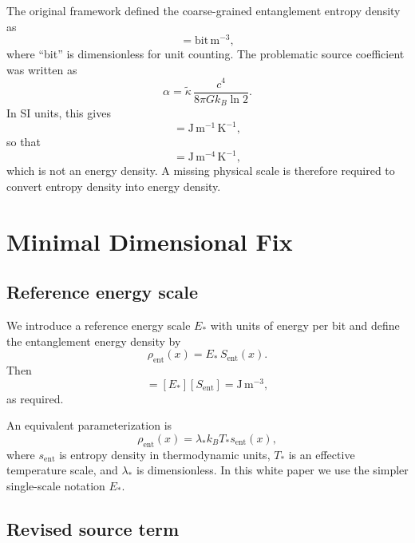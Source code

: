 \documentclass[11pt]{article}
\begin{document}
The original framework defined the coarse-grained entanglement entropy density as
\begin{equation}
[S_{\mathrm{ent}}] = \mathrm{bit\,m^{-3}},
\end{equation}
where ``bit'' is dimensionless for unit counting. The problematic source coefficient was written as
\begin{equation}
\alpha = \tilde{\kappa}\,\frac{c^4}{8\pi G k_B \ln 2}.
\end{equation}
In SI units, this gives
\begin{equation}
[\alpha] = \mathrm{J\,m^{-1}\,K^{-1}},
\end{equation}
so that
\begin{equation}
[\alpha S_{\mathrm{ent}}] = \mathrm{J\,m^{-4}\,K^{-1}},
\end{equation}
which is not an energy density. A missing physical scale is therefore required to convert entropy density into energy density.

\section{Minimal Dimensional Fix}

\subsection{Reference energy scale}

We introduce a reference energy scale $E_*$ with units of energy per bit and define the entanglement energy density by
\begin{equation}
\rho_{\mathrm{ent}}(x) = E_*\,S_{\mathrm{ent}}(x).
\end{equation}
Then
\begin{equation}
[\rho_{\mathrm{ent}}] = [E_*][S_{\mathrm{ent}}] = \mathrm{J\,m^{-3}},
\end{equation}
as required.

An equivalent parameterization is
\begin{equation}
\rho_{\mathrm{ent}}(x) = \lambda_* k_B T_* s_{\mathrm{ent}}(x),
\end{equation}
where $s_{\mathrm{ent}}$ is entropy density in thermodynamic units, $T_*$ is an effective temperature scale, and $\lambda_*$ is dimensionless. In this white paper we use the simpler single-scale notation $E_*$.

\subsection{Revised source term}
\end{document}

